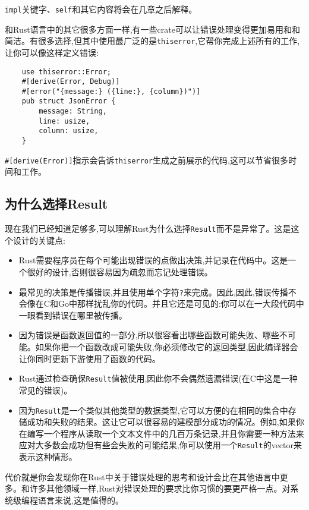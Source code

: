 \texttt{impl}关键字、\texttt{self}和其它内容将会在几章之后解释。

和Rust语言中的其它很多方面一样,有一些crate可以让错误处理变得更加易用和和简洁。有很多选择,但其中使用最广泛的是\texttt{thiserror},它帮你完成上述所有的工作,让你可以像这样定义错误:
\begin{verbatim}
    use thiserror::Error;
    #[derive(Error, Debug)]
    #[error("{message:} ({line:}, {column})")]
    pub struct JsonError {
        message: String,
        line: usize,
        column: usize,
    }
\end{verbatim}

\texttt{\#[derive(Error)]}指示会告诉\texttt{thiserror}生成之前展示的代码,这可以节省很多时间和工作。

\subsection{为什么选择Result}
现在我们已经知道足够多,可以理解Rust为什么选择\texttt{Result}而不是异常了。这是这个设计的关键点:
\begin{itemize}
    \item Rust需要程序员在每个可能出现错误的点做出决策,并记录在代码中。这是一个很好的设计,否则很容易因为疏忽而忘记处理错误。
    \item 最常见的决策是传播错误,并且使用单个字符\texttt{?}来完成。因此,因此,错误传播不会像在C和Go中那样扰乱你的代码。并且它还是可见的:你可以在一大段代码中一眼看到错误在哪里被传播。
    \item 因为错误是函数返回值的一部分,所以很容看出哪些函数可能失败、哪些不可能。如果你把一个函数改成可能失败,你必须修改它的返回类型,因此编译器会让你同时更新下游使用了函数的代码。
    \item Rust通过检查确保\texttt{Result}值被使用,因此你不会偶然遗漏错误(在C中这是一种常见的错误)。
    \item 因为\texttt{Result}是一个类似其他类型的数据类型,它可以方便的在相同的集合中存储成功和失败的结果。这让它可以很容易的建模部分成功的情况。例如,如果你在编写一个程序从读取一个文本文件中的几百万条记录,并且你需要一种方法来应对大多数会成功但有些会失败的可能结果,你可以使用一个\texttt{Result}的vector来表示这种情形。
\end{itemize}

代价就是你会发现你在Rust中关于错误处理的思考和设计会比在其他语言中更多。和许多其他领域一样,Rust对错误处理的要求比你习惯的要更严格一点。对系统级编程语言来说,这是值得的。

